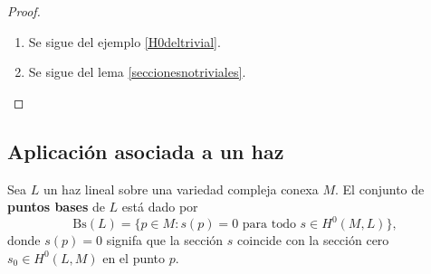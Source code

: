 \begin{proof}
\begin{enumerate}
			Consideremos un polinomio $P$ homogéneo de grado $d$, entonces en cada abierto $U_j$ podemos definir
			\begin{equation*}
				f_j([z])=\frac{P(z)}{z_j^d}.
			\end{equation*}
			Esta función es holomofa en $U_j$, y la expresión coincide en las intersecciones pues $P$ es un polinomio homogéneo de grado $d$. Por lo tanto, la colección $\{f_j\}_{j=0}^n$ determina una sección global holomorfa de $\mathcal{O}(d)$.
			
			\item Se sigue del ejemplo \ref{H0deltrivial}.
			
			\item Se sigue del lema \ref{seccionesnotriviales}.
		\end{enumerate}
	\end{proof}
	
\subsection{Aplicación asociada a un haz}


    \begin{definition}
		Sea $L$ un haz lineal sobre una variedad compleja conexa $M$. El conjunto de \textbf{puntos bases} de $L$ está dado por
		\begin{equation*}
			\mathrm{Bs}(L)=\{p\in M:s(p)=0\text{ para todo }s\in H^0(M,L)\},
		\end{equation*}
		donde $s(p)=0$ signifa que la sección $s$ coincide con la sección cero $s_0\in H^0(L,M)$ en el punto $p$.
	\end{definition}

